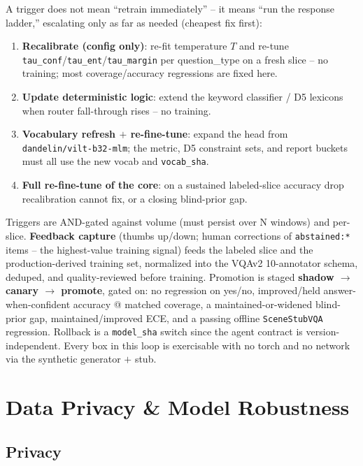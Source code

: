 \documentclass[12pt,a4paper]{article}
\begin{document}
A trigger does not mean ``retrain immediately'' -- it means ``run the response ladder,'' escalating only as far as needed (cheapest fix first):
\begin{enumerate}\setlength\itemsep{0.15em}
  \item \textbf{Recalibrate (config only)}: re-fit temperature $T$ and re-tune \texttt{tau\_conf}/\texttt{tau\_ent}/\texttt{tau\_margin} per question\_type on a fresh slice -- no training; most coverage/accuracy regressions are fixed here.
  \item \textbf{Update deterministic logic}: extend the keyword classifier / D5 lexicons when router fall-through rises -- no training.
  \item \textbf{Vocabulary refresh $+$ re-fine-tune}: expand the head from \texttt{dandelin/vilt-b32-mlm}; the metric, D5 constraint sets, and report buckets must all use the new vocab and \texttt{vocab\_sha}.
  \item \textbf{Full re-fine-tune of the core}: on a sustained labeled-slice accuracy drop recalibration cannot fix, or a closing blind-prior gap.
\end{enumerate}
Triggers are AND-gated against volume (must persist over N windows) and per-slice. \textbf{Feedback capture} (thumbs up/down; human corrections of \texttt{abstained:*} items -- the highest-value training signal) feeds the labeled slice and the production-derived training set, normalized into the VQAv2 10-annotator schema, deduped, and quality-reviewed before training. Promotion is staged \textbf{shadow $\rightarrow$ canary $\rightarrow$ promote}, gated on: no regression on yes/no, improved/held answer-when-confident accuracy @ matched coverage, a maintained-or-widened blind-prior gap, maintained/improved ECE, and a passing offline \texttt{SceneStubVQA} regression. Rollback is a \texttt{model\_sha} switch since the agent contract is version-independent. Every box in this loop is exercisable with no torch and no network via the synthetic generator $+$ stub.

\section{Data Privacy \& Model Robustness}

\subsection{Privacy}
\end{document}
